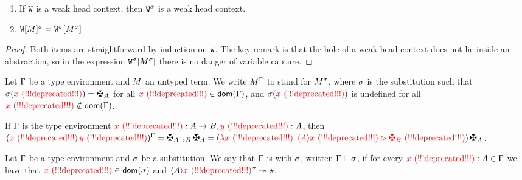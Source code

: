 \begin{lemma}
\label{lem:subst_commute_wctx}
\quad
\begin{enumerate}
\item
  If $\mathtt{W}$ is a weak head context,
  then $\mathtt{W}^{\sigma}$ is a weak head context. 
\item
  $\mathtt{W}[M]^{\sigma}
  = \mathtt{W}^{\sigma}[M^{\sigma}]$
\end{enumerate}
\end{lemma}
\begin{proof}
Both items are straightforward by induction on $\mathtt{W}$.
The key remark is that the hole of a weak head context does not lie
inside an abstraction, so in the expression
$\mathtt{W}^{\sigma}[M^{\sigma}]$ there is no
danger of variable capture.
\end{proof}

\begin{definition}
Let $\Gamma$ be a type environment and $M$ an untyped term.
We write $M^{\Gamma}$ to stand for $M^{\sigma}$,
where $\sigma$ is the substitution such that
$\subst(\var) = \gen{\typ}$ for all $\textcolor{red}{x \text{\,\,(!!!deprecated!!!)}} \in \mathsf{dom}(\Gamma)$,
and $\sigma(\textcolor{red}{x \text{\,\,(!!!deprecated!!!)}})$ is undefined for all $\textcolor{red}{x \text{\,\,(!!!deprecated!!!)}} \notin \mathsf{dom}(\Gamma)$.
\end{definition}

\begin{example}
If $\Gamma$ is the type environment $\textcolor{red}{x \text{\,\,(!!!deprecated!!!)}}:A\to B,\textcolor{red}{y \text{\,\,(!!!deprecated!!!)}}:A$,
then
$\subs{(\var\,\vartwo)}{\tenv}
= \gen{\typ\to\typtwo}\,\gen{\typ}
= (\lam{\var}{\eunit{\verif{\typ}\var}{\gen{\typtwo}}})\,\gen{\typ}
$.
\end{example}

\begin{definition}[Compatibility]
Let $\Gamma$ be a type environment and $\sigma$ be a substitution.
We say that $\Gamma$ is  with $\sigma$,
written $\Gamma\vDash\sigma$,
if for every $\textcolor{red}{x \text{\,\,(!!!deprecated!!!)}}:A \in \Gamma$ we have that $\textcolor{red}{x \text{\,\,(!!!deprecated!!!)}} \in \mathsf{dom}(\sigma)$
and $\langle A\rangle\textcolor{red}{x \text{\,\,(!!!deprecated!!!)}}^{\sigma} \twoheadrightarrow \star$.
\end{definition}

